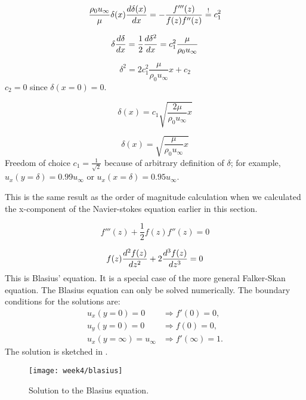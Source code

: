 \begin{equation}
\frac{\rho_0 u_\infty}{\mu} \delta(x) \frac{d \delta(x)}{d x} = -\frac{f'''(z)}{f(z)f''(z)} \overset{!}{=} c_1^2
\end{equation}

\begin{equation}
\delta\frac{d \delta}{d x} = \frac{1}{2}\frac{d \delta^2}{d x} = c_1^2\frac{\mu}{\rho_0u_\infty}\\
\end{equation}

\begin{equation}
\delta^2 = 2c_1^2 \frac{\mu}{\rho_0u_\infty}x + c_2
\end{equation}
$c_2=0$ since $\delta(x=0)=0$.

\begin{equation}
\delta(x) = c_1\sqrt{\frac{2\mu}{\rho_0u_\infty}x}
\end{equation}

\begin{equation}
\delta(x)=\sqrt{\frac{\mu}{\rho_0u_\infty}x}
\end{equation}
Freedom of choice $c_1=\frac{1}{\sqrt{2}}$ because of arbitrary definition of $\delta$; for example, $u_x(y=\delta)=0.99u_\infty$ or $u_x(x=\delta)=0.95u_\infty$.

This is the same result as the order of magnitude calculation when we calculated the x-component of the Navier-stokes equation earlier in this section.

\begin{equation}
f'''(z) +\frac{1}{2} f(z)f''(z) = 0
\end{equation}

\begin{equation}
f(z)\frac{d^2 f(z)}{d z^2}+2\frac{d^3 f(z)}{d z^3}=0
\end{equation}
This is Blasius' equation. It is a special case of the more general Falker-Skan equation. The Blasius equation can only be solved numerically. The boundary conditions for the solutions are:
\begin{align}
u_x(y=0)=0&\Rightarrow f'(0)=0, \\
u_y(y=0)=0&\Rightarrow f(0)=0, \\
u_x(y=\infty)=u_\infty&\Rightarrow f'(\infty)=1.
\end{align}
The solution is sketched in .
\begin{figure}[!h]
    \centering
    \texttt{[image: week4/blasius]}\\
    \caption{Solution to the Blasius equation.}
    \label{fig:blasius}
\end{figure}


